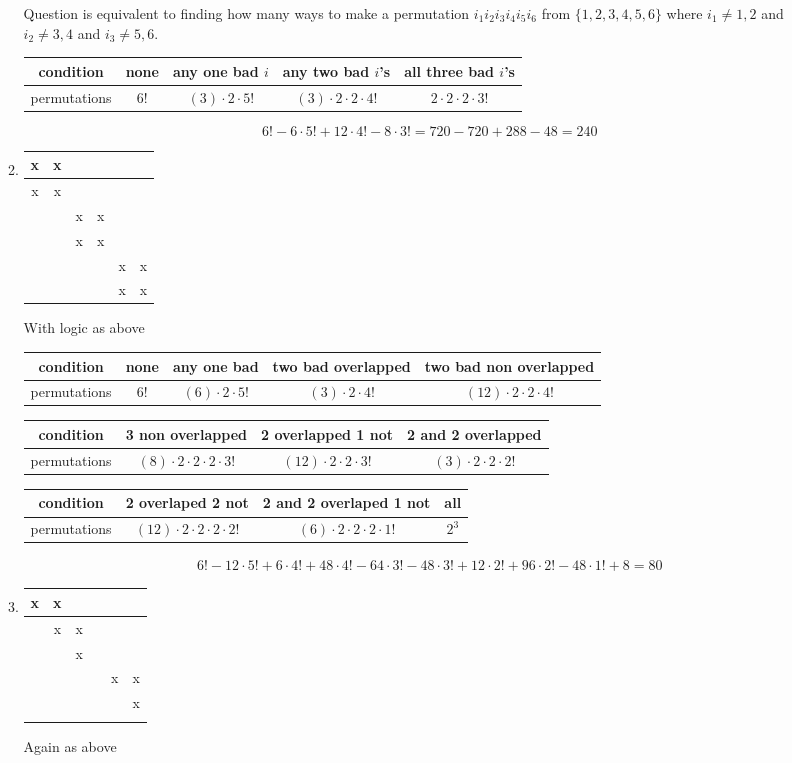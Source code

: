 \documentclass{article}
\begin{document}
\begin{enumerate}
\begin{enumerate}
Question is equivalent to finding how many ways to make a permutation $i_1i_2i_3i_4i_5i_6$ from $\{1,2,3,4,5,6\}$ where $i_1\ne1,2$ and $i_2\ne3,4$ and $i_3\ne5,6$.

\begin{tabular}{c|c|c|c|c}
  condition&
  none&
  any one bad $i$&
  any two bad $i$'s&
  all three bad $i$'s
  \\
  \hline
  permutations&
  6!&
  $(3)\cdot2\cdot5!$&
  $(3)\cdot2\cdot2\cdot4!$&
  $2\cdot2\cdot2\cdot3!$
\end{tabular}
\[6!-6\cdot5!+12\cdot4!-8\cdot3!=720-720+288-48=240\]
\item
\begin{tabular}{|c|c|c|c|c|c|}
\hline
x&x&&&&\\
\hline
x&x&&&&\\
\hline
&&x&x&&\\
\hline
&&x&x&&\\
\hline
&&&&x&x\\
\hline
&&&&x&x\\
\hline
\end{tabular}

With logic as above

\begin{tabular}{c|c|c|c|c}
  condition&
  none&
  any one bad&
  two bad overlapped&
  two bad non overlapped
  \\
  \hline
  permutations&
  6!&
  $(6)\cdot2\cdot5!$&
  $(3)\cdot2\cdot4!$&
  $(12)\cdot2\cdot2\cdot4!$
\end{tabular}

\begin{tabular}{c|c|c|c}
  condition&
  3 non overlapped&
  2 overlapped 1 not&
  2 and 2 overlapped
  \\
  \hline
  permutations&
  $(8)\cdot2\cdot2\cdot2\cdot3!$&
  $(12)\cdot2\cdot2\cdot3!$&
  $(3)\cdot2\cdot2\cdot2!$
\end{tabular}

\begin{tabular}{c|c|c|c}
  condition&
  2 overlaped 2 not&
  2 and 2 overlaped 1 not&
  all
  \\
  \hline
  permutations&
  $(12)\cdot2\cdot2\cdot2\cdot2!$&
  $(6)\cdot2\cdot2\cdot2\cdot1!$&
  $2^3$
\end{tabular}
\begin{align*}
  6!-12\cdot5!+6\cdot4!+48\cdot4!-64\cdot3!-48\cdot3!+12\cdot2!+96\cdot2!-48\cdot1!+8=80
\end{align*}

\item
\begin{tabular}{|c|c|c|c|c|c|}
\hline
x&x&&&&\\
\hline
&x&x&&&\\
\hline
&&x&&&\\
\hline
&&&&x&x\\
\hline
&&&&&x\\
\hline
&&&&&\\
\hline
\end{tabular}
Again as above


\end{enumerate}
\end{enumerate}
\end{document}

